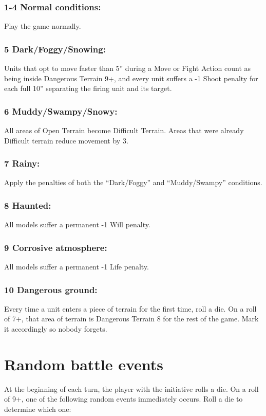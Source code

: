 \begin{multicols}{2}
\subsubsection*{1-4 Normal conditions:} Play the game normally.

\subsubsection*{5 Dark/Foggy/Snowing:} Units that opt to move faster than 5'' during a Move or Fight Action count as being inside Dangerous Terrain 9+, and every unit suffers a -1 Shoot penalty for each full 10'' separating the firing unit and its target.

\subsubsection*{6 Muddy/Swampy/Snowy:} All areas of Open Terrain become Difficult Terrain. Areas that were already Difficult terrain reduce movement by 3.

\subsubsection*{7 Rainy:} Apply the penalties of both the ``Dark/Foggy'' and ``Muddy/Swampy'' conditions.

\subsubsection*{8 Haunted:} All models suffer a permanent -1 Will penalty.

\subsubsection*{9 Corrosive atmosphere:} All models suffer a permanent -1 Life penalty.

\subsubsection*{10 Dangerous ground:} Every time a unit enters a piece of terrain for the first time, roll a die. On a roll of 7+, that area of terrain is Dangerous Terrain 8 for the rest of the game. Mark it accordingly so nobody forgets.




\section*{Random battle events}
At the beginning of each turn, the player with the initiative rolls a die. On a roll of 9+, one of the following random events immediately occurs. Roll a die to determine which one:


\end{multicols}
